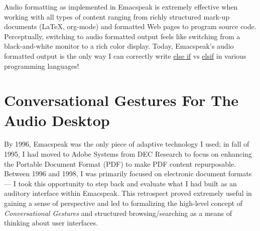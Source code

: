\documentclass[11pt]{article}
\begin{document}
Audio formatting as implemented in Emacspeak is extremely
effective when working with all types of content ranging from
richly structured mark-up documents (\LaTeX{}, org-mode) and
formatted Web pages to program source code. Perceptually,
switching to audio formatted output feels like switching from a
black-and-white monitor to a rich color display. Today,
Emacspeak's audio formatted output is the only way I can
correctly write \uline{else if} vs \uline{elsif} in various programming
languages!

\section{Conversational Gestures For The Audio Desktop}
\label{sec-9}

By 1996, Emacspeak was the only piece of adaptive technology I
used; in fall of 1995, I had moved to Adobe Systems from DEC
Research to focus on enhancing the Portable Document Format (PDF)
to make PDF content repurposable. Between 1996 and 1998, I was
primarily focused on electronic document formats — I took this
opportunity to step back and evaluate what I had built as an
auditory interface within Emacspeak. This retrospect proved
extremely useful in gaining a sense of perspective and led to
formalizing the high-level concept of \emph{Conversational Gestures}
and structured browsing/searching as a means of thinking about
user interfaces.
\end{document}
